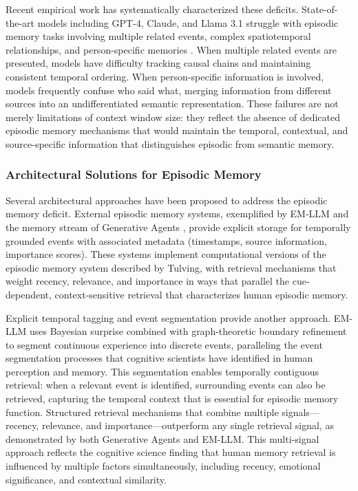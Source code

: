 \documentclass[11pt,letterpaper]{article}
\begin{document}
Recent empirical work has systematically characterized these deficits. State-of-the-art models including GPT-4, Claude, and Llama 3.1 struggle with episodic memory tasks involving multiple related events, complex spatiotemporal relationships, and person-specific memories \cite{ning2025episodic}. When multiple related events are presented, models have difficulty tracking causal chains and maintaining consistent temporal ordering. When person-specific information is involved, models frequently confuse who said what, merging information from different sources into an undifferentiated semantic representation. These failures are not merely limitations of context window size: they reflect the absence of dedicated episodic memory mechanisms that would maintain the temporal, contextual, and source-specific information that distinguishes episodic from semantic memory.

\subsubsection{Architectural Solutions for Episodic Memory}

Several architectural approaches have been proposed to address the episodic memory deficit. External episodic memory systems, exemplified by EM-LLM \cite{hu2025emllm} and the memory stream of Generative Agents \cite{park2023generative}, provide explicit storage for temporally grounded events with associated metadata (timestamps, source information, importance scores). These systems implement computational versions of the episodic memory system described by Tulving, with retrieval mechanisms that weight recency, relevance, and importance in ways that parallel the cue-dependent, context-sensitive retrieval that characterizes human episodic memory.

Explicit temporal tagging and event segmentation provide another approach. EM-LLM \cite{hu2025emllm} uses Bayesian surprise combined with graph-theoretic boundary refinement to segment continuous experience into discrete events, paralleling the event segmentation processes that cognitive scientists have identified in human perception and memory. This segmentation enables temporally contiguous retrieval: when a relevant event is identified, surrounding events can also be retrieved, capturing the temporal context that is essential for episodic memory function. Structured retrieval mechanisms that combine multiple signals---recency, relevance, and importance---outperform any single retrieval signal, as demonstrated by both Generative Agents and EM-LLM. This multi-signal approach reflects the cognitive science finding that human memory retrieval is influenced by multiple factors simultaneously, including recency, emotional significance, and contextual similarity.
\end{document}
